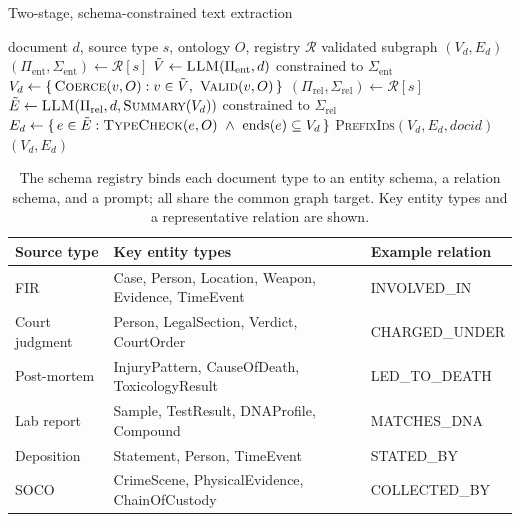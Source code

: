 \documentclass[conference]{IEEEtran}
\newcommand{\rel}[1]{\textup{\MakeUppercase{#1}}}
\begin{document}
\begin{algorithm}[t]
\caption{Two-stage, schema-constrained text extraction}
\label{alg:text}
\begin{algorithmic}[1]
\Require document $d$, source type $s$, ontology $O$, registry $\mathcal{R}$
\Ensure validated subgraph $(V_d,E_d)$
\State $(\Pi_{\text{ent}},\Sigma_{\text{ent}}) \gets \mathcal{R}[s]$
\State $\tilde V \gets \textsc{LLM}(\Pi_{\text{ent}},d)$ constrained to $\Sigma_{\text{ent}}$
\State $V_d \gets \{\,\textsc{Coerce}(v,O) : v\in\tilde V,\ \textsc{Valid}(v,O)\,\}$
\State $(\Pi_{\text{rel}},\Sigma_{\text{rel}}) \gets \mathcal{R}[s]$
\State $\tilde E \gets \textsc{LLM}(\Pi_{\text{rel}}, d, \textsc{Summary}(V_d))$ constrained to $\Sigma_{\text{rel}}$
\State $E_d \gets \{\, e\in\tilde E : \textsc{TypeCheck}(e,O)\ \wedge\ \mathrm{ends}(e)\subseteq V_d \,\}$
\State \textsc{PrefixIds}$(V_d,E_d,\mathit{docid})$ 
\State \Return $(V_d,E_d)$
\end{algorithmic}
\end{algorithm}

\begin{table}[t]
  \centering
  \caption{The schema registry binds each document type to an entity schema, a
  relation schema, and a prompt; all share the common graph target. Key entity
  types and a representative relation are shown.}
  \label{tab:registry}
  \footnotesize
  \setlength{\tabcolsep}{3.5pt}
  \begin{tabular}{@{}P{1.4cm}P{2.65cm}P{3.05cm}@{}}
    \toprule
    \textbf{Source type} & \textbf{Key entity types} & \textbf{Example relation} \\
    \midrule
    FIR & Case, Person, Location, Weapon, Evidence, TimeEvent & \rel{involved\_in} \\
    Court judgment & Person, LegalSection, Verdict, CourtOrder & \rel{charged\_under} \\
    Post-mortem & InjuryPattern, CauseOfDeath, ToxicologyResult & \rel{led\_to\_death} \\
    Lab report & Sample, TestResult, DNAProfile, Compound & \rel{matches\_dna} \\
    Deposition & Statement, Person, TimeEvent & \rel{stated\_by} \\
    SOCO & CrimeScene, PhysicalEvidence, ChainOfCustody & \rel{collected\_by} \\
    \bottomrule
  \end{tabular}
\end{table}
\end{document}

